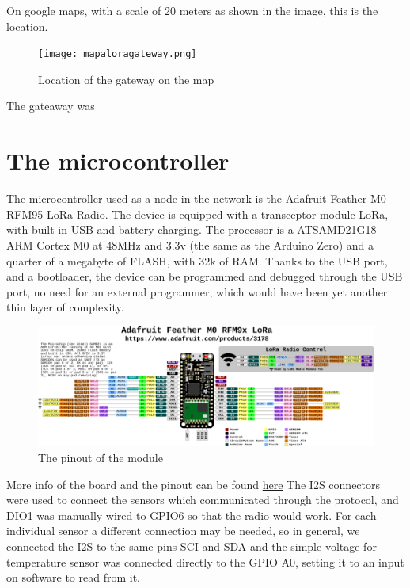 On google maps, with a scale of 20 meters as shown in the image, this 
is the location. 

\begin{figure}[htbp]
    \texttt{[image: mapaloragateway.png]}
    \caption{Location of the gateway on the map}
\end{figure}

The gateaway was 

\section{The microcontroller}
\label{sec:s-micro}
The microcontroller used as a node in the network is the Adafruit Feather
M0 RFM95 LoRa Radio. The device is equipped with a transceptor
module LoRa, with built in USB and battery charging. The processor is
a ATSAMD21G18 ARM Cortex M0 at 48MHz and 3.3v (the same as the
Arduino Zero) and a quarter of a megabyte of FLASH, with 32k of RAM.
Thanks to the USB port, and a bootloader, the device can be
programmed and debugged through the USB port, no need for an
external programmer, which would have been yet another thin layer of
complexity. 
\begin{figure}[htbp]
\includegraphics[width=\linewidth]{pinout.png}
\caption{The pinout of the module}
\end{figure}
More info of the board and the pinout can be found \href{https://learn.adafruit.com/adafruit-feather-m0-radio-with-lora-radio-module/pinouts}{here}
The I2S connectors were used to connect the sensors which
communicated through the protocol, and DIO1 was manually wired to
GPIO6 so that the radio would work. For each individual sensor a different connection may be needed, so in
general, we connected the I2S to the same pins SCI and SDA and the
simple voltage for temperature sensor was connected directly to the
GPIO A0, setting it to an input on software to read from it.

